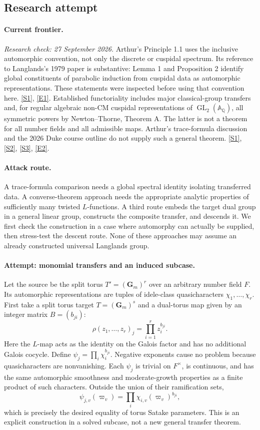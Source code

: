\documentclass[11pt,a4paper]{article}
\newcommand{\Q}{\mathbb{Q}}
\newcommand{\A}{\mathbb{A}}
\newcommand{\sref}[2]{\hyperlink{source:#1:#2}{[S#2]}}
\newcommand{\eref}[2]{\hyperlink{extra:#1:#2}{[E#2]}}
\begin{document}
\subsection{Research attempt}
\paragraph{Current frontier.}
\textit{Research check: 27 September 2026.}
Arthur's Principle 1.1 uses the inclusive automorphic convention, not
only the discrete or cuspidal spectrum. Its reference to Langlands's
1979 paper is substantive: Lemma 1 and Proposition 2 identify global
constituents of parabolic induction from cuspidal data as automorphic
representations. These statements were inspected before using that
convention here. \sref{30006675}{1}, \eref{30006675}{1}.
Established functoriality includes major classical-group transfers and,
for regular algebraic non-CM cuspidal representations of
$\operatorname{GL}_2(\A_{\Q})$, all symmetric powers by Newton--Thorne,
Theorem A. The latter is not a theorem for all number fields and all
admissible maps. Arthur's trace-formula discussion and the 2026 Duke
course outline do not supply such a general theorem. \sref{30006675}{1},
\sref{30006675}{2}, \sref{30006675}{3}, \eref{30006675}{2}.

\paragraph{Attack route.}
A trace-formula comparison needs a global spectral identity isolating
transferred data. A converse-theorem approach needs the appropriate
analytic properties of sufficiently many twisted $L$-functions. A
third route embeds the target dual group in a general linear group,
constructs the composite transfer, and descends it. We first check the
construction in a case where automorphy can actually be supplied, then
stress-test the descent route. None of these approaches may assume an
already constructed universal Langlands group.

\paragraph{Attempt: monomial transfers and an induced subcase.}
Let the source be the split torus $T'=(\mathbf G_m)^r$ over an arbitrary
number field $F$. Its automorphic representations are tuples of
idele-class quasicharacters $\chi_1,\ldots,\chi_r$. First take a split
torus target $T=(\mathbf G_m)^s$ and a dual-torus map given by an integer
matrix $B=(b_{ji})$:
\[
 \rho(z_1,\ldots,z_r)_j=\prod_{i=1}^r z_i^{b_{ji}}.
 \tag{7.1}
\]
Here the $L$-map acts as the identity on the Galois factor and has no
additional Galois cocycle. Define
$\psi_j=\prod_i\chi_i^{b_{ji}}$. Negative exponents cause no problem
because quasicharacters are nonvanishing. Each $\psi_j$ is trivial on
$F^\times$, is continuous, and has the same automorphic smoothness and
moderate-growth properties as a finite product of such characters.
Outside the union of their ramification sets,
\[
 \psi_{j,v}(\varpi_v)=\prod_i\chi_{i,v}(\varpi_v)^{b_{ji}},
 \tag{7.2}
\]
which is precisely the desired equality of torus Satake parameters.
This is an explicit construction in a solved subcase, not a new general
transfer theorem.
\end{document}
